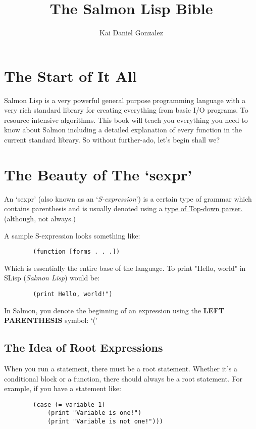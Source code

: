 \documentclass{article}
\title{The Salmon Lisp Bible}
\author{Kai Daniel Gonzalez}
\begin{document}
	\maketitle
	\tableofcontents
	\newpage
	\section{The Start of It All}
	Salmon Lisp is a very powerful general purpose programming language with a
	very rich standard library for creating everything from basic I/O programs. To resource intensive algorithms.
	\newline
	\newline
	This book will teach you everything you need to know about Salmon including a detailed explanation of every function in the current standard library. So without further-ado, let's begin shall we?
	\section{The Beauty of The `sexpr'}
	An `sexpr' (also known as an `\emph{S-expression}') is a certain type of grammar which
	contains parenthesis and is usually denoted using a \href{https://en.wikipedia.org/wiki/Top-down_parsing}{type of Top-down parser.} (although, not always.)
	
	A sample S-expression looks something like:

	\begin{lstlisting}
		(function [forms . . .])
	\end{lstlisting}

	Which is essentially the entire base of the language. To print "Hello, world" in SLisp (\emph{Salmon Lisp}) would be:
	
	\begin{lstlisting}
		(print Hello, world!")
	\end{lstlisting}

	In Salmon, you denote the beginning of an expression using the \textbf{LEFT PARENTHESIS} symbol: `('
	
	\subsection{The Idea of Root Expressions}
	When you run a statement, there must be a root statement. Whether it's a conditional block or a function, there should always be a root statement. For example, if you have a statement like:
	\begin{lstlisting}
		(case (= variable 1)
			(print "Variable is one!")
			(print "Variable is not one!")))
	\end{lstlisting}
\end{document}

